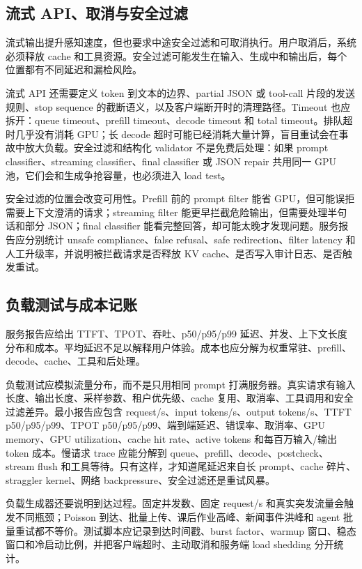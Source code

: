 \documentclass[UTF8,zihao=-4,openany]{ctexbook}
\begin{document}
\subsection{流式 API、取消与安全过滤}
流式输出提升感知速度，但也要求中途安全过滤和可取消执行。用户取消后，系统必须释放 cache 和工具资源。安全过滤可能发生在输入、生成中和输出后，每个位置都有不同延迟和漏检风险。

流式 API 还需要定义 token 到文本的边界、partial JSON 或 tool-call 片段的发送规则、stop sequence 的截断语义，以及客户端断开时的清理路径。Timeout 也应拆开：queue timeout、prefill timeout、decode timeout 和 total timeout。排队超时几乎没有消耗 GPU；长 decode 超时可能已经消耗大量计算，盲目重试会在事故中放大负载。安全过滤和结构化 validator 不是免费后处理：如果 prompt classifier、streaming classifier、final classifier 或 JSON repair 共用同一 GPU 池，它们会和生成争抢容量，也必须进入 load test。

安全过滤的位置会改变可用性。Prefill 前的 prompt filter 能省 GPU，但可能误拒需要上下文澄清的请求；streaming filter 能更早拦截危险输出，但需要处理半句话和部分 JSON；final classifier 能看完整回答，却可能太晚才发现问题。服务报告应分别统计 unsafe compliance、false refusal、safe redirection、filter latency 和人工升级率，并说明被拦截请求是否释放 KV cache、是否写入审计日志、是否触发重试。

\subsection{负载测试与成本记账}
服务报告应给出 TTFT、TPOT、吞吐、p50/p95/p99 延迟、并发、上下文长度分布和成本。平均延迟不足以解释用户体验。成本也应分解为权重常驻、prefill、decode、cache、工具和后处理。

负载测试应模拟流量分布，而不是只用相同 prompt 打满服务器。真实请求有输入长度、输出长度、采样参数、租户优先级、cache 复用、取消率、工具调用和安全过滤差异。最小报告应包含 request/s、input tokens/s、output tokens/s、TTFT p50/p95/p99、TPOT p50/p95/p99、端到端延迟、错误率、取消率、GPU memory、GPU utilization、cache hit rate、active tokens 和每百万输入/输出 token 成本。慢请求 trace 应能分解到 queue、prefill、decode、postcheck、stream flush 和工具等待。只有这样，才知道尾延迟来自长 prompt、cache 碎片、straggler kernel、网络 backpressure、安全过滤还是重试风暴。

负载生成器还要说明到达过程。固定并发数、固定 request/s 和真实突发流量会触发不同瓶颈；Poisson 到达、批量上传、课后作业高峰、新闻事件洪峰和 agent 批量重试都不等价。测试脚本应记录到达时间戳、burst factor、warmup 窗口、稳态窗口和冷启动比例，并把客户端超时、主动取消和服务端 load shedding 分开统计。
\end{document}
